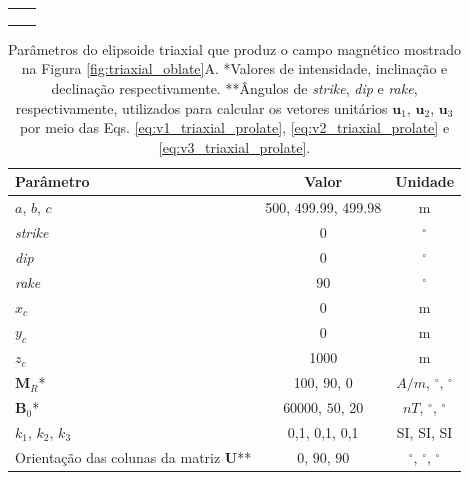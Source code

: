\begin{table}[h!]
	\begin{center}
		\begin{tabular}{lc}
			
			&  \\
			& \\
			& \\
		\end{tabular}
	\end{center}
\end{table}

\begin{table}[h!]
	\begin{center}
		\begin{tabular}{|l|c|c|}
			\hline
			\textbf{Parâmetro}  & \textbf{Valor} & \textbf{Unidade} \\
			\hline 
			$a$, $b$, $c$   & 500, 499.99, 499.98 & m\\
			\hline
			\textit{strike}   & $0$ & $^{\circ}$\\
			\hline
			\textit{dip}   & $0$ & $^{\circ}$\\
			\hline
			\textit{rake}   & $90$  & $^{\circ}$\\
			\hline
			$x_c$   & 0  & m\\
			\hline          
			$y_c$   & 0  & m\\
			\hline                
			$z_c$   & 1000 & m \\
			\hline
			$\mathbf{M}_{R}$*  & 100, $90$, $0$ & $A/m$, $^{\circ}$, $^{\circ}$ \\
			\hline
			$\mathbf{B}_{0}$*    & 60000, $50$, $20$ & $nT$, $^{\circ}$, $^{\circ}$ \\
			\hline
			$k_{1}$, $k_{2}$, $k_{3}$   & 0,1, 0,1, 0,1 & SI, SI, SI \\
			\hline
			Orientação das colunas da matriz $\mathbf{U}$**  & $0$, $90$, $90$ & $^{\circ}$, $^{\circ}$, $^{\circ}$ \\
			\hline
		\end{tabular}
		\caption{Parâmetros do elipsoide triaxial que produz o campo magnético mostrado na Figura \ref{fig:triaxial_oblate}A. *Valores de intensidade, inclinação e declinação respectivamente. **Ângulos de \textit{strike}, \textit{dip} e \textit{rake}, respectivamente, utilizados para calcular os vetores unitários $\mathbf{u}_{1}$, $\mathbf{u}_{2}$, $\mathbf{u}_{3}$ por meio das Eqs. \ref{eq:v1_triaxial_prolate}, \ref{eq:v2_triaxial_prolate} e \ref{eq:v3_triaxial_prolate}.}
	\end{center}
	\label{tab:triaxial_oblate1}
\end{table}

